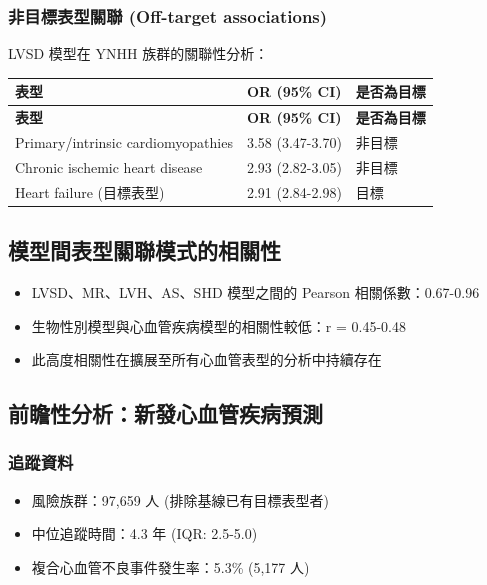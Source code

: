 \documentclass[12pt,a4paper]{article}
\begin{document}
\subsubsection{非目標表型關聯 (Off-target associations)}

LVSD 模型在 YNHH 族群的關聯性分析：

\begin{longtable}{p{6cm}p{4cm}p{4cm}}
\toprule
\textbf{表型} & \textbf{OR (95\% CI)} & \textbf{是否為目標} \\
\midrule
\endfirsthead
\toprule
\textbf{表型} & \textbf{OR (95\% CI)} & \textbf{是否為目標} \\
\midrule
\endhead
Primary/intrinsic cardiomyopathies & 3.58 (3.47-3.70) & 非目標 \\
\midrule
Chronic ischemic heart disease & 2.93 (2.82-3.05) & 非目標 \\
\midrule
Heart failure (目標表型) & 2.91 (2.84-2.98) & \textcolor{emergency_red}{目標} \\
\bottomrule
\end{longtable}


\subsection{模型間表型關聯模式的相關性}

\begin{itemize}
    \item LVSD、MR、LVH、AS、SHD 模型之間的 Pearson 相關係數：0.67-0.96
    \item 生物性別模型與心血管疾病模型的相關性較低：r = 0.45-0.48
    \item 此高度相關性在擴展至所有心血管表型的分析中持續存在
\end{itemize}

\subsection{前瞻性分析：新發心血管疾病預測}

\subsubsection{追蹤資料}

\begin{itemize}
    \item 風險族群：97,659 人 (排除基線已有目標表型者)
    \item 中位追蹤時間：4.3 年 (IQR: 2.5-5.0)
    \item 複合心血管不良事件發生率：5.3\% (5,177 人)
\end{itemize}
\end{document}
